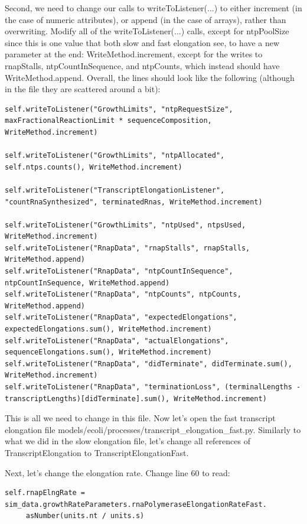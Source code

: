 \documentclass[12pt]{article}
\begin{document}
Second, we need to change our calls to writeToListener(...) to either increment (in the case of numeric attributes), or append (in the case of arrays), rather than overwriting. Modify all of the writeToListener(...) calls, except for ntpPoolSize since this is one value that both slow and fast elongation see, to have a new parameter at the end:  WriteMethod.increment, except for the writes to rnapStalls, ntpCountInSequence, and ntpCounts, which instead should have WriteMethod.append. Overall, the lines should look like the following (although in the file they are scattered around a bit):
\begin{lstlisting}
self.writeToListener("GrowthLimits", "ntpRequestSize", maxFractionalReactionLimit * sequenceComposition, WriteMethod.increment)

self.writeToListener("GrowthLimits", "ntpAllocated", self.ntps.counts(), WriteMethod.increment)

self.writeToListener("TranscriptElongationListener", "countRnaSynthesized", terminatedRnas, WriteMethod.increment)

self.writeToListener("GrowthLimits", "ntpUsed", ntpsUsed, WriteMethod.increment)
self.writeToListener("RnapData", "rnapStalls", rnapStalls, WriteMethod.append)
self.writeToListener("RnapData", "ntpCountInSequence", ntpCountInSequence, WriteMethod.append)
self.writeToListener("RnapData", "ntpCounts", ntpCounts, WriteMethod.append)
self.writeToListener("RnapData", "expectedElongations", expectedElongations.sum(), WriteMethod.increment)
self.writeToListener("RnapData", "actualElongations", sequenceElongations.sum(), WriteMethod.increment)
self.writeToListener("RnapData", "didTerminate", didTerminate.sum(), WriteMethod.increment)
self.writeToListener("RnapData", "terminationLoss", (terminalLengths - transcriptLengths)[didTerminate].sum(), WriteMethod.increment)
\end{lstlisting}

This is all we need to change in this file. Now let’s open the fast transcript elongation file models/ecoli/processes/transcript\_elongation\_fast.py. Similarly to what we did in the slow elongation file, let’s change all references of TranscriptElongation to TranscriptElongationFast.

Next, let’s change the elongation rate. Change line 60 to read:

\begin{lstlisting}
self.rnapElngRate = sim_data.growthRateParameters.rnaPolymeraseElongationRateFast.
	 asNumber(units.nt / units.s)
\end{lstlisting}
\end{document}
